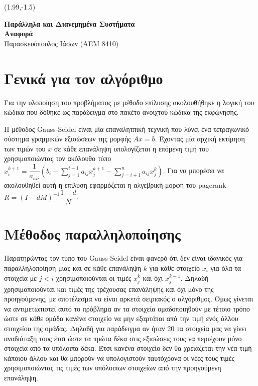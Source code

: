 \documentclass[10p]{report}
\begin{document}
\begin{textblock}{7.5}(1.99,-1.5)	
\begin{center}
\textbf{\Large{Παράλληλα και Διανεμημένα Συστήματα}}\\
\textbf{\large{Αναφορά }} \\
\normalsize{Παρασκευόπουλος Ιάσων (ΑΕΜ 8410)}
\end{center}
\end{textblock}

\section*{Γενικά για τον αλγόριθμο}

Για την υλοποίηση του προβλήματος  με μέθοδο επίλυσης 
ακολουθήθηκε η λογική του κώδικα που δόθηκε ως παράδειγμα στο πακέτο ανοιχτού
κώδικα της εκφώνησης. 

Η μέθοδος Gauss-Seidel είναι μία επαναλητπική τεχνική που λύνει ένα τετραγωνικό
σύστημα γραμμικών εξισώσεων της μορφής $ Ax=b $. Έχοντας μία αρχική εκτίμηση των τιμών
του $ x $ σε κάθε επανάληψη υπολογίζεται η επόμενη τιμή του χρησιμοποιώντας τον
ακόλουθο τύπο $ x_i^{k+1} = \dfrac{1}{a_{aii}}(b_i - \sum_{j=1}^{i-1} a_{ij}x_j^{k+1} - \sum_{j=i+1}^{n} a_{ij}x_j^k)$.
Για να μπορέσει να ακολουθηθεί αυτή η επίλυση
εφαρμόζεται η αλγεβρική μορφή του pagerank $ R = (I - dM)^{-1}\dfrac{1-d}{N} $. 

\section*{Μέθοδος παραλληλοποίησης}

Παρατηρώντας τον τύπο του Gauss-Seidel είναι φανερό ότι δεν είναι ιδανικός για
παραλληλοποίηση μιας και σε κάθε επανάληψη $ k $ για κάθε στοιχείο $ x_i $ για όλα τα
στοιχεία με $ j < i $ χρησιμοποιούνται οι τιμές $ x_j^{k}$ και όχι $ x_j^{k-1}$.
Δηλαδή χρησιμοποιούνται και τιμές της τρέχουσας επανάληψης και όχι μόνο της προηγούμενης, με αποτέλεσμα
να είναι αρκετά σειριακός ο αλγόριθμος. Όμως γίνεται να αντιμετωπιστεί αυτό το
πρόβλημα αν τα στοιχεία ομαδοποιηθούν με τέτοιο τρόπο ώστε σε κάθε ομάδα κανένα
στοιχείο να μην εξαρτάται από την τιμή ενός άλλου στοιχείου της ομάδας.
Δηλαδή για παράδειγμα αν ήταν 20 τα στοιχεία μας να γίνει αναδιάταξη τους έτσι
ώστε τα πρώτα δέκα στις εξισώσεις τους να περιέχουν μόνο στοιχεία από τα υπόλοιπα
δέκα. Έτσι κανένα στοιχείο δεν θα χρειάζεται την νέα τιμή κάποιου άλλου και θα
μπορούν να υπολογιστούν ταυτόχρονα οι νέες τους τιμές χρησιμοποιώντας τις τιμές
των υπόλοιπων στοιχείων από την προηγούμενη επανάληψη.
\end{document}
